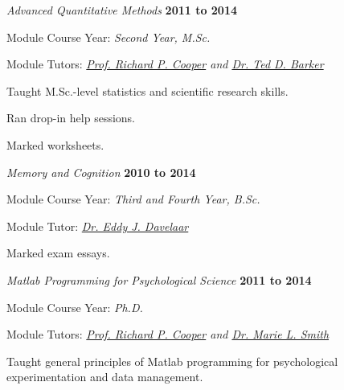 \begin{outerlist}
\item[] \textit{Advanced Quantitative Methods}
         \hfill \textbf{2011 to 2014}
\begin{innerlist}
\item Module Course Year: \textit{Second Year, M.Sc.}
\item Module Tutors: \textit{\href{http://www.bbk.ac.uk/psychology/our-staff/academic/richard-cooper/richard-cooper}{Prof. Richard P. Cooper} and \href{http://www.bbk.ac.uk/psychology/our-staff/academic/edward-barker/edward-barker}{Dr. Ted D. Barker}}

\item Taught M.Sc.-level statistics and scientific research skills.
\item Ran drop-in help sessions.
\item Marked worksheets.
\end{innerlist}

\item[] \textit{Memory and Cognition}
         \hfill \textbf{2010 to 2014}
\begin{innerlist}
\item Module Course Year: \textit{Third and Fourth Year, B.Sc.}
\item Module Tutor: \textit{\href{http://www.bbk.ac.uk/psychology/our-staff/academic/eddy-davelaar/eddy-davelaar}{Dr. Eddy J. Davelaar}}
\item Marked exam essays.

\end{innerlist}

\item[] \textit{Matlab Programming for Psychological Science}
         \hfill \textbf{2011 to 2014}
\begin{innerlist}
\item Module Course Year: \textit{Ph.D.}
\item Module Tutors: \textit{\href{http://www.bbk.ac.uk/psychology/our-staff/academic/richard-cooper/richard-cooper}{Prof. Richard P. Cooper} and \href{http://www.bbk.ac.uk/psychology/our-staff/academic/marie-smith/marie-smith}{Dr. Marie L. Smith}}
\item Taught general principles of Matlab programming for psychological experimentation and data management.

\end{innerlist}
\end{outerlist}





